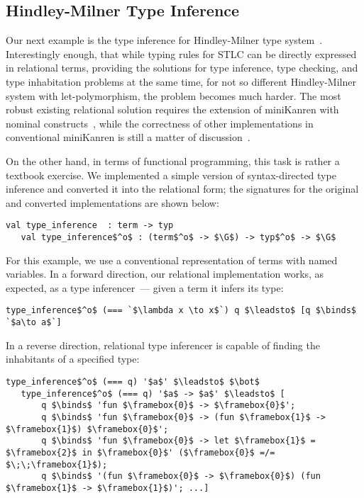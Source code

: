\subsection{Hindley-Milner Type Inference}

Our next example is the type inference for Hindley-Milner type system~\cite{Types}. Interestingly enough, that while typing rules for
STLC can be directly expressed in relational terms, providing the solutions for type inference, type checking, and type inhabitation
problems at the same time, for not so different Hindley-Milner system with let-polymorphism, the problem becomes much
harder. The most robust existing relational solution requires the extension of miniKanren with nominal constructs~\cite{alphaKanren}, while
the correctness of other implementations in conventional miniKanren is still a matter of discussion~\cite{WillOnHM}.

On the other hand, in terms of functional programming, this task is rather a textbook exercise. We implemented a simple version of
syntax-directed type inference and converted it into the relational form; the signatures for the original and converted
implementations are shown below:

\begin{lstlisting}[basicstyle=\small]
   val type_inference  : term -> typ
   val type_inference$^o$ : (term$^o$ -> $\G$) -> typ$^o$ -> $\G$
\end{lstlisting}

For this example, we use a conventional representation of terms with named variables. In a forward direction, our relational implementation works, 
as expected, as a type inferencer~--- given a term it infers its type:

\begin{lstlisting}[basicstyle=\small]
   type_inference$^o$ (=== `$\lambda x \to x$`) q $\leadsto$ [q $\binds$ `$a\to a$`]
\end{lstlisting}

In a reverse direction, relational type inferencer is capable of finding the inhabitants of a specified type:

\begin{lstlisting}[basicstyle=\small]
   type_inference$^o$ (=== q) '$a$' $\leadsto$ $\bot$
   type_inference$^o$ (=== q) '$a$ -> $a$' $\leadsto$ [
       q $\binds$ 'fun $\framebox{0}$ -> $\framebox{0}$'; 
       q $\binds$ 'fun $\framebox{0}$ -> (fun $\framebox{1}$ -> $\framebox{1}$) $\framebox{0}$'; 
       q $\binds$ 'fun $\framebox{0}$ -> let $\framebox{1}$ = $\framebox{2}$ in $\framebox{0}$' ($\framebox{0}$ =/= $\;\;\framebox{1}$);
       q $\binds$ '(fun $\framebox{0}$ -> $\framebox{0}$) (fun $\framebox{1}$ -> $\framebox{1}$)'; ...]
\end{lstlisting}

